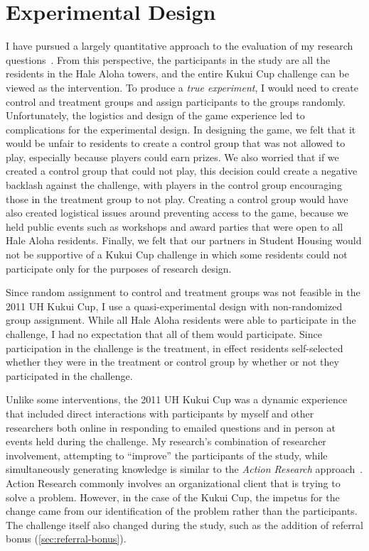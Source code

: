 \section{Experimental Design}

I have pursued a largely quantitative approach to the evaluation of my research questions~\cite{Creswell2003}. From this perspective, the participants in the study are all the residents in the Hale Aloha towers, and the entire Kukui Cup challenge can be viewed as the intervention. To produce a \emph{true experiment}, I would need to create control and treatment groups and assign participants to the groups randomly. Unfortunately, the logistics and design of the game experience led to complications for the experimental design. In designing the game, we felt that it would be unfair to residents to create a control group that was not allowed to play, especially because players could earn prizes. We also worried that if we created a control group that could not play, this decision could create a negative backlash against the challenge, with players in the control group encouraging those in the treatment group to not play. Creating a control group would have also created logistical issues around preventing access to the game, because we held public events such as workshops and award parties that were open to all Hale Aloha residents. Finally, we felt that our partners in Student Housing would not be supportive of a Kukui Cup challenge in which some residents could not participate only for the purposes of research design.

Since random assignment to control and treatment groups was not feasible in the 2011 UH Kukui Cup, I use a quasi-experimental design with non-randomized group assignment. While all Hale Aloha residents were able to participate in the challenge, I had no expectation that all of them would participate. Since participation in the challenge is the treatment, in effect residents self-selected whether they were in the treatment or control group by whether or not they participated in the challenge.

Unlike some interventions, the 2011 UH Kukui Cup was a dynamic experience that included direct interactions with participants by myself and other researchers both online in responding to emailed questions and in person at events held during the challenge. My research's combination of researcher involvement, attempting to ``improve'' the participants of the study, while simultaneously generating knowledge is similar to the \emph{Action Research} approach~\cite{kock2013}. Action Research commonly involves an organizational client that is trying to solve a problem. However, in the case of the Kukui Cup, the impetus for the change came from our identification of the problem rather than the participants. The challenge itself also changed during the study, such as the addition of referral bonus (\autoref{sec:referral-bonus}).


